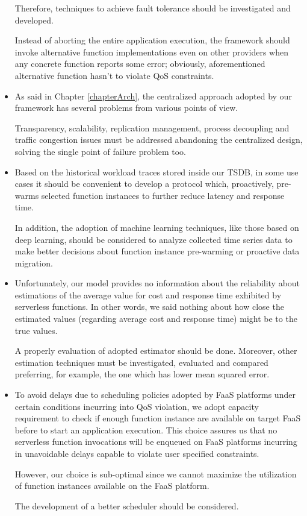 \documentclass[12pt,a4paper]{report}
\begin{document}
\begin{itemize}
	Therefore, techniques to achieve fault tolerance should be investigated and developed. 
	
	Instead of aborting the entire application execution, the framework should invoke alternative function implementations even on other providers when any concrete function reports some error; obviously, aforementioned alternative function hasn't to violate QoS constraints. 

	\item As said in Chapter \ref{chapterArch}, the centralized approach adopted by our framework has several problems from various points of view.
	
	Transparency, scalability, replication management, process decoupling and traffic congestion issues must be addressed abandoning the centralized design, solving the single point of failure problem too.
	
	\item Based on the historical workload traces stored inside our TSDB, in some use cases it should be convenient to develop a protocol which, proactively, pre-warms selected function instances to further reduce latency and response time. 
	
	In addition, the adoption of machine learning techniques, like those based on deep learning, should be considered to analyze collected time series data to make better decisions about function instance pre-warming or proactive data migration.
			
	\item Unfortunately, our model provides no information about the reliability about estimations of the average value for cost and response time exhibited by serverless functions. In other words, we said nothing about how close the estimated values (regarding average cost and response time) might be to the true values. 
	
	A properly evaluation of adopted estimator should be done. Moreover, other estimation techniques must be investigated, evaluated and compared preferring, for example, the one which has lower mean squared error. 

	\item To avoid delays due to scheduling policies adopted by FaaS platforms under certain conditions incurring into QoS violation, we adopt capacity requirement to check if enough function instance are available on target FaaS before to start an application execution. This choice assures us that no serverless function invocations will be enqueued on FaaS platforms incurring in unavoidable delays capable to violate user specified constraints.
	
	However, our choice is sub-optimal since we cannot maximize the utilization of function instances available on the FaaS platform.
	
	The development of a better scheduler should be considered.
	
\end{itemize}






\end{document}
